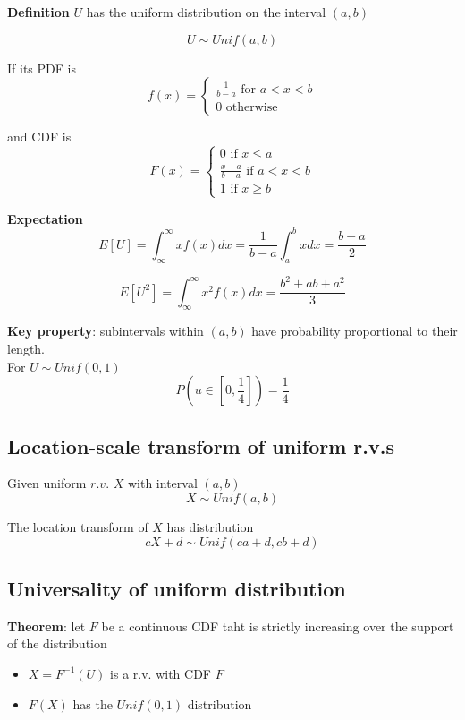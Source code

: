 \begin{framed}
   \textbf{Definition} $U$ has the uniform distribution on the interval $(a, b)$
     
   \[
     U \sim Unif(a, b)
   \] 

   If its PDF is 
   \[
     f(x) =
     \begin{cases}
        \frac{1}{b - a} \text{ for } a < x < b \\
        0 \text{ otherwise}
     \end{cases}
   \] 

   and CDF is
   \[
     F(x) =
     \begin{cases}
        0 \text{ if } x \leq a \\
        \frac{x - a}{b - a} \text{ if } a < x < b \\
        1 \text{ if } x \geq b
     \end{cases}
   \] 

   \textbf{Expectation}
   \[
      E[U] = \int_{\infty}^{\infty}  xf(x) dx = \frac{1}{b-a} \int_{a}^{b}  xdx = \frac{b + a}{2}  
   \] 

   \[
     E\left[ U^2\right]  = \int_{\infty}^{\infty}  x^2 f(x) dx = \frac{b^2 + ab + a^2}{3} 
   \] 

   \textbf{Key property}: subintervals within $(a, b)$ have probability proportional to their length. \\

   For $U \sim Unif(0, 1)$
    \[
       P(u \in [0, \frac{1}{4}]) = \frac{1}{4}
   \] 
\end{framed}

\subsection{Location-scale transform of uniform r.v.s}

\begin{framed}
   Given uniform  $r.v.$ $X$ with interval $(a, b)$
    \[
     X \sim Unif(a, b)
   \] 

   The location transform of $X$ has distribution
   \[
     cX + d \sim Unif(ca + d, cb + d)
   \] 
\end{framed}

\subsection{Universality of uniform distribution}
\begin{framed}
   \textbf{Theorem}: let $F$ be a continuous CDF taht is strictly increasing over the support of the distribution 
   \begin{itemize}
      \item $X = F^{-1} (U) $ is a r.v. with CDF $F$
      \item  $F(X)$ has the $Unif(0, 1)$ distribution
   \end{itemize}
\end{framed}







